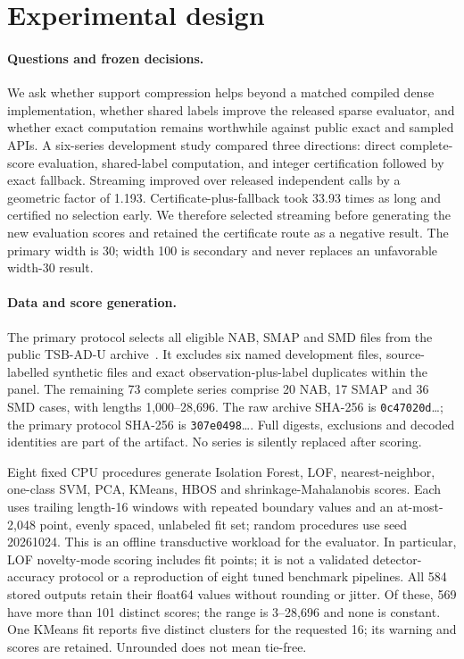 
\section{Experimental design}
\label{sec:design}
\paragraph{Questions and frozen decisions.}
We ask whether support compression helps beyond a matched compiled dense
implementation, whether shared labels improve the released sparse evaluator,
and whether exact computation remains worthwhile against public exact and
sampled APIs. A six-series development study compared three directions:
direct complete-score evaluation, shared-label computation, and integer
certification followed by exact fallback. Streaming improved over released
independent calls by a geometric factor of 1.193. Certificate-plus-fallback took
33.93 times as long and certified no selection early. We therefore selected
streaming before generating the new evaluation scores and retained the
certificate route as a negative result. The primary width is 30; width 100
is secondary and never replaces an unfavorable width-30 result.

\paragraph{Data and score generation.}
The primary protocol selects all eligible NAB, SMAP and SMD files from the
public TSB-AD-U archive~\cite{tsbad}. It excludes six named development files,
source-labelled synthetic files and exact observation-plus-label duplicates
within the panel. The remaining 73 complete series comprise 20 NAB, 17 SMAP
and 36 SMD cases, with lengths 1,000--28,696. The raw archive SHA-256 is
\texttt{0c47020d}\ldots; the primary protocol SHA-256 is
\texttt{307e0498}\ldots. Full digests, exclusions and decoded identities are
part of the artifact. No series is silently replaced after scoring.

Eight fixed CPU procedures generate Isolation Forest, LOF, nearest-neighbor,
one-class SVM, PCA, KMeans, HBOS and shrinkage-Mahalanobis scores. Each uses
trailing length-16 windows with repeated boundary values and an at-most-2,048
point, evenly spaced, unlabeled fit set; random procedures use seed 20261024.
This is an offline transductive workload for the evaluator. In particular,
LOF novelty-mode scoring includes fit points; it is not a validated detector-
accuracy protocol or a reproduction of eight tuned benchmark pipelines. All
584 stored outputs retain their float64 values without rounding or jitter.
Of these, 569 have more than 101 distinct scores; the range is 3--28,696 and
none is constant. One KMeans fit reports five distinct clusters for the requested
16; its warning and scores are retained. Unrounded does not mean tie-free.

